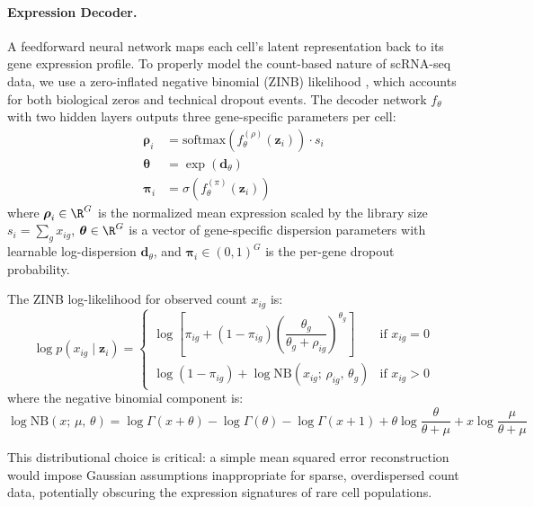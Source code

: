 \documentclass{article}
\newcommand{\sigmoid}{\sigma}
\begin{document}
\paragraph{Expression Decoder.} A feedforward neural network maps each cell's latent representation back to its gene expression profile. To properly model the count-based nature of scRNA-seq data, we use a zero-inflated negative binomial (ZINB) likelihood \cite{lopez2018deep}, which accounts for both biological zeros and technical dropout events. The decoder network $f_\theta$ with two hidden layers outputs three gene-specific parameters per cell:
\begin{align}
    \boldsymbol{\rho}_i &= \text{softmax}\!\left(f_\theta^{(\rho)}(\mathbf{z}_i)\right) \cdot s_i  \label{eq:zinb_mu} \\
    \boldsymbol{\theta} &= \exp\!\left(\mathbf{d}_\theta\right) \label{eq:zinb_theta} \\
    \boldsymbol{\pi}_i &= \sigmoid\!\left(f_\theta^{(\pi)}(\mathbf{z}_i)\right) \label{eq:zinb_pi}
\end{align}
where $\boldsymbol{\rho}_i \in \R^G$ is the normalized mean expression scaled by the library size $s_i = \sum_g x_{ig}$, $\boldsymbol{\theta} \in \R^G$ is a vector of gene-specific dispersion parameters with learnable log-dispersion $\mathbf{d}_\theta$, and $\boldsymbol{\pi}_i \in (0,1)^G$ is the per-gene dropout probability.

The ZINB log-likelihood for observed count $x_{ig}$ is:
\begin{equation}
    \log p(x_{ig} \mid \mathbf{z}_i) =
    \begin{cases}
        \log\!\left[\pi_{ig} + (1 - \pi_{ig})\left(\dfrac{\theta_g}{\theta_g + \rho_{ig}}\right)^{\!\theta_g}\right] & \text{if } x_{ig} = 0 \\[10pt]
        \log(1 - \pi_{ig}) + \log \text{NB}(x_{ig};\, \rho_{ig},\, \theta_g) & \text{if } x_{ig} > 0
    \end{cases}
    \label{eq:zinb_ll}
\end{equation}
where the negative binomial component is:
\begin{equation}
    \log \text{NB}(x;\, \mu,\, \theta) = \log \Gamma(x + \theta) - \log \Gamma(\theta) - \log \Gamma(x + 1) + \theta \log\!\frac{\theta}{\theta + \mu} + x \log\!\frac{\mu}{\theta + \mu}
    \label{eq:nb}
\end{equation}

This distributional choice is critical: a simple mean squared error reconstruction would impose Gaussian assumptions inappropriate for sparse, overdispersed count data, potentially obscuring the expression signatures of rare cell populations.
\end{document}
